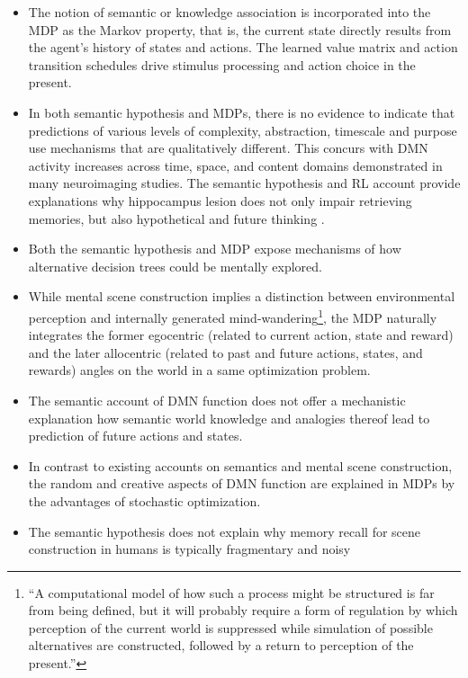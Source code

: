 \documentclass{article} %
\begin{document}
\begin{itemize}
  \item The notion of semantic or knowledge association is
  incorporated into the MDP as the Markov property,
  that is, the current state directly results from the
  agent's history of states and actions. The learned
  value matrix and action transition schedules drive
  stimulus processing and action choice in the present.
  \item In both semantic hypothesis and MDPs,
  there is no evidence to indicate that predictions of various
  levels of complexity, abstraction, timescale and purpose
  use mechanisms that are qualitatively different. This concurs with
  DMN activity increases across time, space, and content domains
  demonstrated in many neuroimaging studies. The semantic hypothesis
  and RL account provide explanations why hippocampus lesion does
  not only impair retrieving memories, but also hypothetical and future
  thinking \citep{hassabis2007patients}.
  \item Both the semantic hypothesis and MDP expose mechanisms of
  how alternative decision trees could be mentally explored.
  \item While mental scene construction implies a distinction between
  environmental perception and internally generated mind-wandering\footnote{
  ``A computational model of how such a process might be structured
  is far from being defined, but it will probably require a form of
  regulation by which perception of the current world is suppressed
  while simulation of possible alternatives are constructed,
  followed by a return to perception of the present.''\citep{buckner2007self}},
  the MDP naturally integrates the former egocentric
  (related to current action, state and reward) and the later
  allocentric (related to past and future actions, states, and rewards)
  angles on the world in a same optimization problem.
  \item The semantic account of DMN function does not offer
  a mechanistic explanation how semantic world knowledge and analogies thereof
  lead to prediction of future actions and states.
  \item In contrast to existing accounts on semantics and
  mental scene construction, the random and creative aspects of DMN function
  are explained in MDPs by the advantages of stochastic optimization.
  \item The semantic hypothesis does not explain why memory recall
  for scene construction in humans is typically fragmentary and noisy

\end{itemize}
\end{document}
